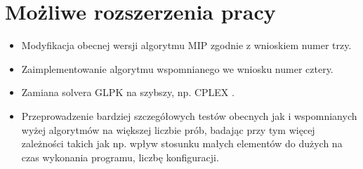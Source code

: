 \section{Możliwe rozszerzenia pracy}
\begin{itemize}
	\item Modyfikacja obecnej wersji algorytmu MIP zgodnie z wnioskiem numer trzy.
	\item Zaimplementowanie algorytmu wspomnianego we wniosku numer cztery.
	\item Zamiana solvera GLPK na szybszy, np. CPLEX \cite{GLPK_BENCHMARK}.
	\item Przeprowadzenie bardziej szczegółowych testów obecnych jak i wspomnianych wyżej algorytmów na większej liczbie prób, badając przy tym więcej zależności takich jak np. wpływ stosunku małych elementów do dużych na czas wykonania programu, liczbę konfiguracji.
\end{itemize}


